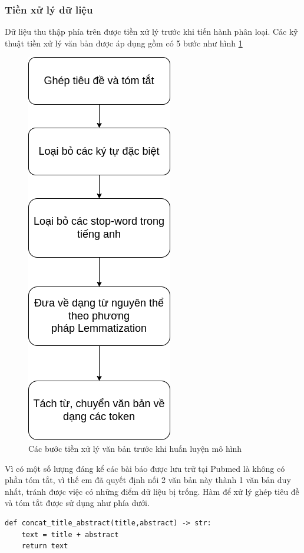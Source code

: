 \documentclass[../DoAn.tex]{subfiles}
\begin{document}
\subsubsection{Tiền xử lý dữ liệu}
Dữ liệu thu thập phía trên được tiền xử lý trước khi tiến hành phân loại. Các kỹ thuật tiền xử lý văn bản được áp dụng gồm có 5 bước như hình \ref{fig:pretext}
\begin{figure}
\centering
\includegraphics[width=0.5\linewidth]{Hinh_ve/preprocessingtext.png}
\caption{Các bước tiền xử lý văn bản trước khi huấn luyện mô hình}
\label{fig:pretext}
\end{figure}

Vì có một số lượng đáng kể các bài báo được lưu trữ tại Pubmed là không có phần tóm tắt, vì thế em đã quyết định nối 2 văn bản này thành 1 văn bản duy nhất, tránh được việc có những điểm dữ liệu bị trống. Hàm để xử lý ghép tiêu đề và tóm tắt được sử dụng như phía dưới.
\begin{lstlisting}
def concat_title_abstract(title,abstract) -> str:
    text = title + abstract
    return text
\end{lstlisting}
\end{document}
